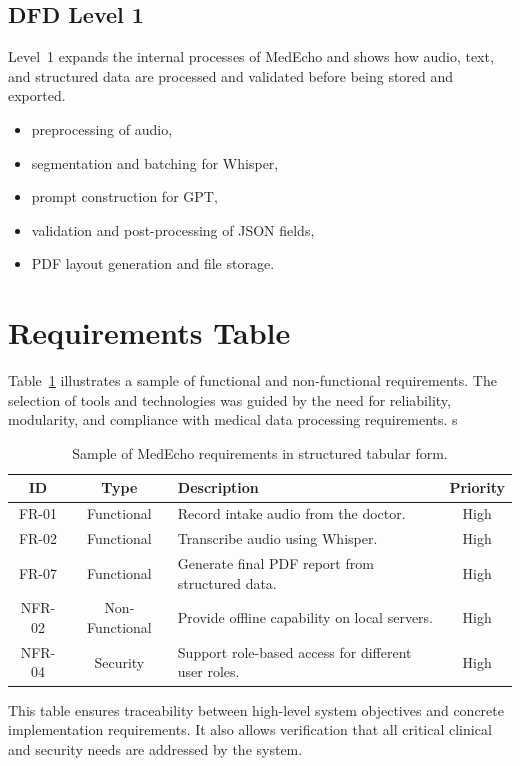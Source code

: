 \subsection*{DFD Level 1}

Level~1 expands the internal processes of MedEcho and shows how audio, text, and structured data are processed and validated before being stored and exported.

\begin{itemize}
    \item preprocessing of audio,
    \item segmentation and batching for Whisper,
    \item prompt construction for GPT,
    \item validation and post-processing of JSON fields,
    \item PDF layout generation and file storage.
\end{itemize}



\section{Requirements Table}\label{sec:analysis:stories}
Table~\ref{tab:reqs} illustrates a sample of functional and non-functional requirements.
The selection of tools and technologies was guided by the need for reliability, modularity, and compliance with medical data processing requirements.
s


\begin{table}[ht]
\centering
\renewcommand{\arraystretch}{1.3}
\setlength{\tabcolsep}{6pt}
\begin{tabular}{|c|c|p{7cm}|c|}
\hline
\textbf{ID} & \textbf{Type} & \textbf{Description} & \textbf{Priority} \\
\hline
FR-01 & Functional       & Record intake audio from the doctor. & High \\
\hline
FR-02 & Functional       & Transcribe audio using Whisper. & High \\
\hline
FR-07 & Functional       & Generate final PDF report from structured data. & High \\
\hline
NFR-02 & Non-Functional & Provide offline capability on local servers. & High \\
\hline
NFR-04 & Security       & Support role-based access for different user roles. & High \\
\hline
\end{tabular}
\caption{Sample of MedEcho requirements in structured tabular form.}
\label{tab:reqs}
\end{table}
This table ensures traceability between high-level system objectives and concrete implementation requirements. It also allows verification that all critical clinical and security needs are addressed by the system.


